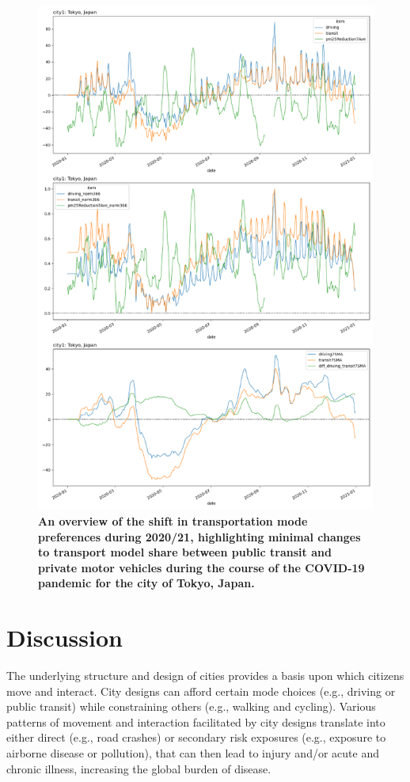 \documentclass[preprint,12pt]{elsarticle}
\begin{document}
\begin{figure}
\centering
\includegraphics[trim={0 455 0 0},clip,scale=0.9]{Images/TokyoTransit_Driving.png}
\caption{\bf An overview of the shift in transportation mode preferences during 2020/21, highlighting minimal changes to transport model share between public transit and private motor vehicles during the course of the COVID-19 pandemic for the city of Tokyo, Japan.}  
 \label{fig:TokyoDriv_trans}
\end{figure}


\section*{Discussion}
The underlying structure and design of cities provides a basis upon which citizens move and interact. City designs can afford certain mode choices (e.g., driving or public transit) while constraining others (e.g., walking and cycling). Various patterns of movement and interaction facilitated by city designs translate into either direct (e.g., road crashes) or secondary risk exposures (e.g., exposure to airborne disease or pollution), that can then lead to injury and/or acute and chronic illness, increasing the global burden of disease.
\end{document}
